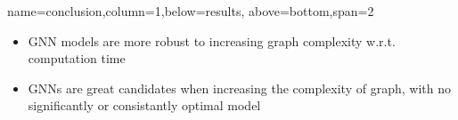 \documentclass[a0paper,portrait]{baposter}
\begin{document}
\begin{poster}
        









%
%
{name=conclusion,column=1,below=results, above=bottom,span=2}{
\begin{itemize}[noitemsep]
    \item GNN models are more robust to increasing graph complexity w.r.t. computation time
    \item GNNs are great candidates when increasing the complexity of graph, with no significantly or consistantly optimal model
    

\end{itemize}}
\end{poster}
\end{document}
